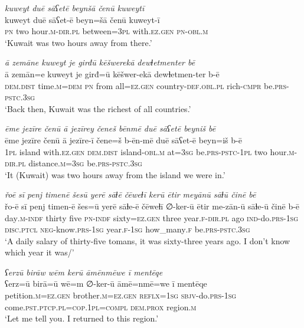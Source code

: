\ea \label{ŽM.41}
\textit{kuweyt duē sāʕetē beynšā čenū kuweytī} \\ 
\gll kuweyt duē sāʕet-ē beyn=šā čenū kuweyt-ī \\ 
 \textsc{pn} two hour\textsc{.m}\textsc{-dir}\textsc{.pl} between\textsc{=3pl} with\textsc{\textsc{.ez}.gen} \textsc{pn}\textsc{-obl}\textsc{.m} \\ 
\glt `Kuwait was two hours away from there.'
\z 
 
\ea \label{ŽM.43}
\textit{ā zemāne kuweyt je girđū kēšwerekā dewɫetmenter bē} \\ 
\gll ā zemān=e kuweyt je girđ=ū kēšwer-ekā dewɫetmen-ter b-ē \\ 
 \textsc{dem.dist} time\textsc{.m}\textsc{=dem} \textsc{pn} from all\textsc{=ez.gen} country\textsc{-def}\textsc{.obl}\textsc{.pl} rich\textsc{-cmpr} be\textsc{.prs}\textsc{-pstc}\textsc{.3sg} \\ 
\glt `Back then, Kuwait was the richest of all countries.'
\z 
 
\ea \label{ŽM.45}
\textit{ēme jezīre čenū ā jezīrey čeneš bēnmē duē sāʕetē beyniš bē} \\ 
\gll ēme jezīre čenū ā jezīre-ī čene=š b-ēn-mē duē sāʕet-ē beyn=iš b-ē \\ 
 \textsc{1pl} island with\textsc{\textsc{.ez}.gen} \textsc{dem.dist} island\textsc{-obl}\textsc{.m} at\textsc{=3sg} be\textsc{.prs}\textsc{-pstc}\textsc{-\textsc{1pl}} two hour\textsc{.m}\textsc{-dir}\textsc{.pl} distance\textsc{.m}\textsc{=3sg} be\textsc{.prs}\textsc{-pstc}\textsc{.3sg} \\ 
\glt `It (Kuwait) was two hours away from the island we were in.'
\z 
 
\ea \label{ŽM.49}
\textit{řoē sī penj timenē šesū yerē sāɫē čēweɫī kerū ētir meyānū sāɫū činē bē} \\ 
\gll řo-ē sī penj timen-ē šes=ū yerē sāɫe-ē čēweɫī ∅-ker-ū ētir me-zān-ū sāɫe-ū činē b-ē \\ 
 day\textsc{.m}\textsc{-indf} thirty five \textsc{pn}\textsc{-indf} sixty\textsc{=ez.gen} three year\textsc{.f}\textsc{-dir}\textsc{.pl} ago \textsc{ind-}do\textsc{.prs}\textsc{-\textsc{1sg}} \textsc{disc}.\textsc{ptcl} \textsc{neg-}know\textsc{.prs}\textsc{-\textsc{1sg}} year\textsc{.f}\textsc{-\textsc{1sg}} how\_many\textsc{.f} be\textsc{.prs}\textsc{-pstc}\textsc{.3sg} \\ 
\glt `A daily salary of thirty-five tomans, it was sixty-three years ago. I don’t know which year it was/'
\z 
 
\ea \label{ŽM.53}
\textit{ʕerzū birāw wēm kerū āmēnmēwe ī mentēqe} \\ 
\gll ʕerz=ū birā=ū wē=m ∅-ker-ū āmē=nmē=we ī mentēqe \\ 
 petition\textsc{.m}\textsc{=ez.gen} brother\textsc{.m}\textsc{=ez.gen} \textsc{reflx}\textsc{=\textsc{1sg}} \textsc{sbjv-}do\textsc{.prs}\textsc{-\textsc{1sg}} come\textsc{.pst}\textsc{.ptcp}\textsc{.pl}\textsc{=cop}\textsc{.\textsc{1pl}}\textsc{=compl} \textsc{dem.prox} region\textsc{.m} \\ 
\glt `Let me tell you. I returned to this region.'
\z 
 
